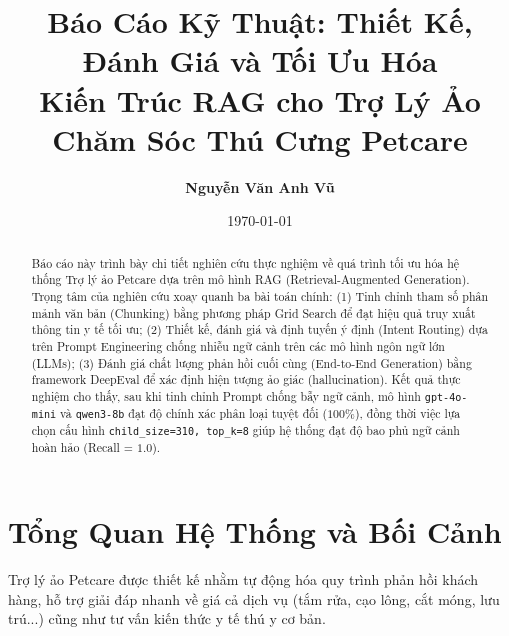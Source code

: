 \documentclass[11pt, a4paper]{article}
\title{\textbf{Báo Cáo Kỹ Thuật: Thiết Kế, Đánh Giá và Tối Ưu Hóa\\Kiến Trúc RAG cho Trợ Lý Ảo Chăm Sóc Thú Cưng Petcare}}
\author{\textbf{Nguyễn Văn Anh Vũ}}
\date{\today}
\begin{document}
\maketitle

\begin{abstract}
Báo cáo này trình bày chi tiết nghiên cứu thực nghiệm về quá trình tối ưu hóa hệ thống Trợ lý ảo Petcare dựa trên mô hình RAG (Retrieval-Augmented Generation). Trọng tâm của nghiên cứu xoay quanh ba bài toán chính: (1) Tinh chỉnh tham số phân mảnh văn bản (Chunking) bằng phương pháp Grid Search để đạt hiệu quả truy xuất thông tin y tế tối ưu; (2) Thiết kế, đánh giá và định tuyến ý định (Intent Routing) dựa trên Prompt Engineering chống nhiễu ngữ cảnh trên các mô hình ngôn ngữ lớn (LLMs); (3) Đánh giá chất lượng phản hồi cuối cùng (End-to-End Generation) bằng framework DeepEval để xác định hiện tượng ảo giác (hallucination). Kết quả thực nghiệm cho thấy, sau khi tinh chỉnh Prompt chống bẫy ngữ cảnh, mô hình \texttt{gpt-4o-mini} và \texttt{qwen3-8b} đạt độ chính xác phân loại tuyệt đối ($100\%$), đồng thời việc lựa chọn cấu hình \texttt{child\_size=310, top\_k=8} giúp hệ thống đạt độ bao phủ ngữ cảnh hoàn hảo (Recall = $1.0$).
\end{abstract}

\tableofcontents
\newpage

\section{Tổng Quan Hệ Thống và Bối Cảnh}
Trợ lý ảo Petcare được thiết kế nhằm tự động hóa quy trình phản hồi khách hàng, hỗ trợ giải đáp nhanh về giá cả dịch vụ (tắm rửa, cạo lông, cắt móng, lưu trú...) cũng như tư vấn kiến thức y tế thú y cơ bản. 
\end{document}
